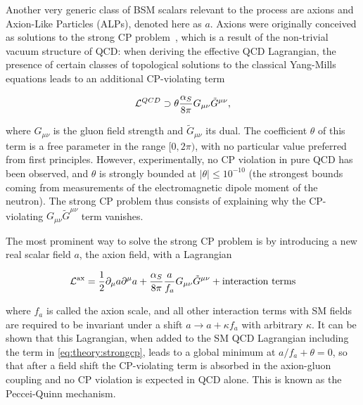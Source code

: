 Another very generic class of BSM scalars relevant to the \pptt process are axions and Axion-Like Particles (ALPs), denoted here as $a$. 
Axions were originally conceived as solutions to the strong CP problem~\cite{Peccei:1977hh,Peccei:1977ur,Weinberg:1977ma,Wilczek:1977pj}, which is a result of the non-trivial vacuum structure of QCD: when deriving the effective QCD Lagrangian, the presence of certain classes of topological solutions to the classical Yang-Mills equations leads to an additional CP-violating term~\cite{DiLuzio:2020wdo}

\begin{equation}
\label{eq:theory:strongcp}
    \mathcal{L}^{QCD} \supset \theta \frac{\alpha_S}{8 \pi} G_{\mu \nu} \tilde{G}^{\mu \nu},
\end{equation}

\noindent where $G_{\mu \nu}$ is the gluon field strength and $\tilde{G}_{\mu \nu}$ its dual. The coefficient $\theta$ of this term is a free parameter in the range $[0,2\pi)$, with no particular value preferred from first principles. However, experimentally, no CP violation in pure QCD has been observed, and $\theta$ is strongly bounded at $|\theta| \leq 10^{-10}$ (the strongest bounds coming from measurements of the electromagnetic dipole moment of the neutron). The strong CP problem thus consists of explaining why the CP-violating $G_{\mu \nu} \tilde{G}^{\mu \nu}$ term vanishes.

The most prominent way to solve the strong CP problem is by introducing a new real scalar field $a$, the axion field, with a Lagrangian~\cite{DiLuzio:2020wdo}

\begin{equation}
\label{eq:theory:axionlagrangian}
    \mathcal{L}^{\mathrm{ax}} = \frac{1}{2} \partial_\mu a \partial^\mu a + \frac{\alpha_S}{8 \pi} \frac{a}{f_a} G_{\mu \nu} \tilde{G}^{\mu \nu} + \text{interaction terms}
\end{equation}

\noindent where $f_a$ is called the axion scale, and all other interaction terms with SM fields are required to be invariant under a shift $a \rightarrow a + \kappa f_a$ with arbitrary $\kappa$. It can be shown that this Lagrangian, when added to the SM QCD Lagrangian including the term in \cref{eq:theory:strongcp}, leads to a global minimum at $a/f_a + \theta = 0$, so that after a field shift the CP-violating term is absorbed in the axion-gluon coupling and no CP violation is expected in QCD alone. This is known as the Peccei-Quinn mechanism.

